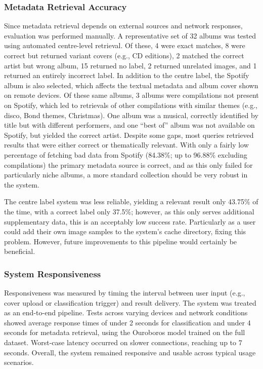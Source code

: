             \subsubsection{Metadata Retrieval Accuracy}
    
                Since metadata retrieval depends on external sources and network responses, evaluation was performed manually. A representative set of 32 albums was tested using automated centre-level retrieval. Of these, 4 were exact matches, 8 were correct but returned variant covers (e.g., CD editions), 2 matched the correct artist but wrong album, 15 returned no label, 2 returned unrelated images, and 1 returned an entirely incorrect label. In addition to the centre label, the Spotify album is also selected, which affects the textual metadata and album cover shown on remote devices. Of these same albums, 3 albums were compilations not present on Spotify, which led to retrievals of other compilations with similar themes (e.g., disco, Bond themes, Christmas). One album was a musical, correctly identified by title but with different performers, and one “best of” album was not available on Spotify, but yielded the correct artist. Despite some gaps, most queries retrieved results that were either correct or thematically relevant. With only a fairly low percentage of fetching bad data from Spotify (84.38\%; up to 96.88\% excluding compilations) the primary metadata source is correct, and as this only failed for particularly niche albums, a more standard collection should be very robust in the system.
    
                The centre label system was less reliable, yielding a relevant result only 43.75\% of the time, with a correct label only 37.5\%; however, as this only serves additional supplementary data, this is an acceptably low success rate. Particularly as a user could add their own image samples to the system's cache directory, fixing this problem. However, future improvements to this pipeline would certainly be beneficial.
    
    
            \subsubsection{System Responsiveness}
    
                Responsiveness was measured by timing the interval between user input (e.g., cover upload or classification trigger) and result delivery. The system was treated as an end-to-end pipeline. Tests across varying devices and network conditions showed average response times of under 2 seconds for classification and under 4 seconds for metadata retrieval, using the Ouroboros model trained on the full dataset. Worst-case latency occurred on slower connections, reaching up to 7 seconds. Overall, the system remained responsive and usable across typical usage scenarios.
    
